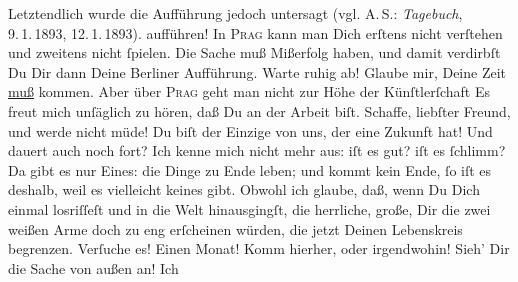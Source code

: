 \begin{ledgroupsized}[t]{13cm}
{{{                  Letztendlich wurde die Aufführung jedoch untersagt (vgl. A. S.: \emph{Tagebuch}, 9. 1. 1893, 12. 1. 1893). }}}\label{K_L02699-4h} aufführen! In \textsc{Prag} kann man Dich erſtens nicht verſtehen und zweitens nicht ſpielen. Die Sache muß Mißerfolg haben, und
               damit verdirbſt Du Dir dann Deine Berliner
               Aufführung. Warte ruhig ab! Glaube mir, Deine Zeit \uline{muß} kommen. Aber über \textsc{Prag} geht man nicht zur Höhe der Künſtlerſchaft{\dotsfour}\pend
           \pstart
           Es freut mich unſäglich zu hören, daß Du an der Arbeit biſt. Schaffe, liebſter
               Freund, und werde nicht {\pb}müde! Du biſt der Einzige von
               uns, der eine Zukunft hat!\pend
           \pstart
           Und \label{K_L02699-5v}\label{K_L02699-5h} dauert auch noch
               fort? Ich kenne mich nicht mehr aus: iſt es gut? iſt es ſchlimm? Da gibt es nur
               Eines: die Dinge zu Ende leben; und  kommt kein
               Ende, ſo iſt es deshalb, weil es vielleicht keines gibt. Obwohl ich glaube, daß, wenn
               Du Dich einmal losriſſeſt und in die Welt hinausgingſt, die herrliche, große, Dir die
               zwei weißen Arme doch zu eng
               erſcheinen würden, die jetzt Deinen {\pb}Lebenskreis
               begrenzen. Verſuche es! Einen Monat! Komm hierher, oder irgendwohin! Sieh’ Dir die
                  Sache von außen an! Ich

\end{ledgroupsized}

